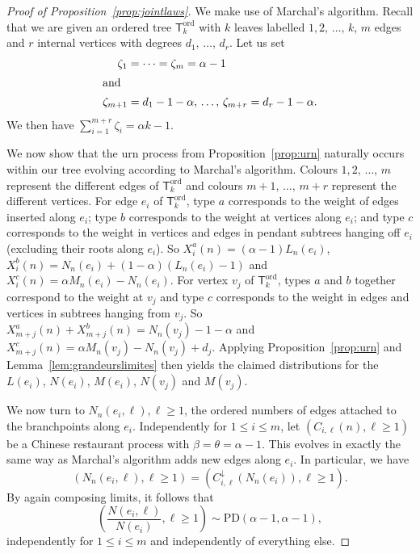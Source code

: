 \documentclass[10pt]{amsart}
\theoremstyle{definition}\newtheorem{defi}[theo]{Definition}\newtheorem{rema}[theo]{Remark}\newtheorem{exam}[theo]{Example}\newtheorem{exem}[theo]{Example}\newtheorem{nota}[theo]{Notation}
\newcommand{\ord}{\mathrm{ord}}
\newcommand{\PD}{\mathrm{PD}}
\newcommand{\sT}{\mathsf{T}}
\begin{document}
\begin{proof}[Proof of Proposition~\ref{prop:jointlaws}]
We make use of Marchal's algorithm. Recall that we are given an ordered tree $\sT_k^{\ord}$ with $k$ leaves labelled $1,2,\,\ldots,\,k$, $m$ edges and $r$ internal vertices with degrees $d_1,\,\ldots,\,d_r$. Let us set
\begin{align*}
\zeta_1 &= \cdots = \zeta_m = \alpha -1
\\
\intertext{and}
\zeta_{m+1} &= d_1 - 1 - \alpha,\,\ldots,\,\zeta_{m+r} = d_r - 1 - \alpha.
\end{align*}
We then have $ \sum_{i=1}^{m+r}\zeta_i = \alpha k - 1$.

We now show that the urn process from Proposition~\ref{prop:urn} naturally occurs within our tree evolving according to Marchal's algorithm. Colours $1, 2,\,\ldots,\,m$ represent the different edges of $\sT_k^{\ord}$ and colours $m+1,\,\ldots,\,m+r$ represent the different vertices. For edge $e_i$ of $\sT_k^{\ord}$, type $a$ corresponds to the weight of edges inserted along $e_i$; type $b$ corresponds to the weight at vertices along $e_i$; and type $c$ corresponds to the weight in vertices and edges in pendant subtrees hanging off $e_i$ (excluding their roots along $e_i$). So $X^a_i(n)=(\alpha-1) L_n(e_i)$, $X_i^b(n) = N_n(e_i) +(1-\alpha)(L_n(e_i)-1)$ and $X_i^c(n) = \alpha M_n(e_i) - N_n(e_i)$. For vertex $v_j$ of $\sT_k^{\ord}$, types $a$ and $b$ together correspond to the weight at $v_j$ and type $c$ corresponds to the weight in edges and vertices in subtrees hanging from $v_j$. So $X^a_{m+j}(n) + X^b_{m+j}(n) = N_n(v_j) -1 - \alpha$ and $X_{m+j}^c(n) =
\alpha M_n(v_j) - N_n(v_j)+d_j$. Applying Proposition~\ref{prop:urn} and Lemma~\ref{lem:grandeurslimites} then yields the claimed distributions for the $L(e_i)$, $N(e_i)$, $M(e_i)$, $N(v_j)$ and $M(v_j)$.

We now turn to $N_n(e_i,\ell), \ell \ge 1$, the ordered numbers of edges attached to the branchpoints along $e_i$. Independently for $1 \le i \le m$, let $(C_{i, \ell}(n), \ell \ge 1)$ be a Chinese restaurant process with $\beta = \theta = \alpha -1$. This evolves in exactly the same way as Marchal's algorithm adds new edges along $e_i$. In particular, we have
\[
\left(N_n\left(e_i,\ell\right), \ell \ge 1\right) = \left(C^{\downarrow}_{i,\ell}\left(N_n(e_i)\right), \ell \ge 1\right).
\]
By again composing limits, it follows that
\[
\left(\frac{N\left(e_i,\ell\right)}{N\left(e_i\right)}, \ell \ge 1\right) \sim \PD(\alpha-1,\alpha-1),
\]
independently for $1 \le i \le m$ and independently of everything else.


\end{proof}
\end{document}
